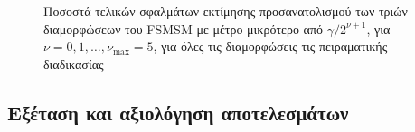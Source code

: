 \begin{figure}\centering
  
  \vspace{-0.5cm}
  \caption{\small Ποσοστά τελικών σφαλμάτων εκτίμησης προσανατολισμού των
           τριών διαμορφώσεων του FSMSM με μέτρο μικρότερο από $\gamma /
           2^{\nu+1}$, για $\nu = 0,1,\dots,\nu_{\max} = 5$, για όλες τις
           διαμορφώσεις τις πειραματικής διαδικασίας}
  \label{fig:02_04_05:14}
\end{figure}




\subsection{Εξέταση και αξιολόγηση αποτελεσμάτων}
\label{subsection:02_04_05:03}

